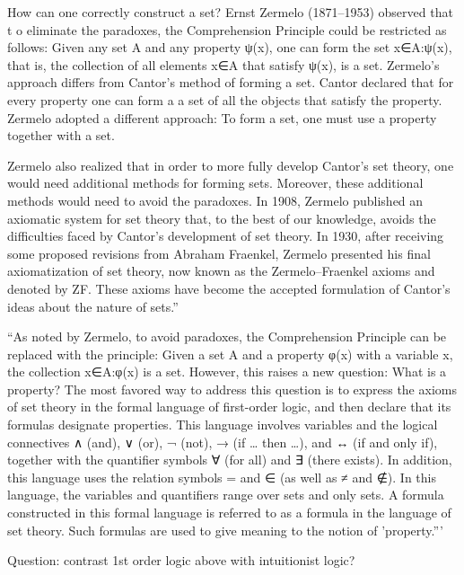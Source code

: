 How can one correctly construct a set? 
Ernst Zermelo (1871–1953) observed that t
o eliminate the paradoxes, 
the Comprehension Principle could be restricted as follows: 
Given any set A and any property ψ(x), 
one can form the set {x∈A:ψ(x)}, that is, 
the collection of all elements x∈A that satisfy ψ(x), is a set.
Zermelo’s approach differs from Cantor’s method of forming a set. 
Cantor declared that for every property one can form 
a a set of all the objects that satisfy the property.
Zermelo adopted a different approach: 
To form a set, one must use a property together with a set.

Zermelo also realized that in order to more fully develop 
Cantor’s set theory, 
one would need additional methods for forming sets. 
Moreover, these additional methods would need 
to avoid the paradoxes. 
In 1908, 
Zermelo published an axiomatic system for set theory that, 
to the best of our knowledge, 
avoids the difficulties faced by 
Cantor’s development of set theory. 
In 1930, 
after receiving some proposed revisions from Abraham Fraenkel,
 Zermelo presented his final axiomatization of set theory, 
 now known as the Zermelo–Fraenkel axioms and denoted by ZF. 
These axioms have become the accepted formulation 
of Cantor’s ideas about the nature of sets.''\cite{iep:Set_theory} 

``As noted by Zermelo, to avoid paradoxes, 
the Comprehension Principle can be replaced with the principle: 
Given a set A and a property φ(x) with a variable x, the 
collection {x∈A:φ(x)} is a set. 
However, this raises a new question: 
What is a property? 
The most favored way to address this question is to express 
the axioms of set theory
in the formal language of first-order logic, 
and then declare that its formulas designate properties. 
This language involves variables and the logical connectives
 ∧ (and), ∨ (or), ¬ (not), → (if … then …), 
 and ↔ (if and only if), 
 together with the quantifier symbols ∀ (for all) 
 and ∃ (there exists). 
 In addition, this language uses the relation symbols
  = and ∈ (as well as ≠ and ∉). 
  In this language, the variables and quantifiers range over sets 
  and only sets. 
  A formula constructed in this formal language is referred to as
   a formula in the language of set theory. Such formulas are used 
   to give meaning to the notion of 
   'property.'''\cite{iep:Set_theory}

Question: 
contrast 1st order logic above 
with intuitionist logic?\cite{wiki:Intuitionistic_logic}


